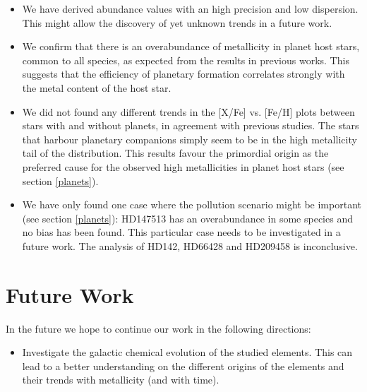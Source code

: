 \documentclass[dvips,12pt,a4paper]{report}
\begin{document}
{{\begin{itemize}
\item We have derived abundance values with an high precision and low dispersion. This might allow the discovery of yet unknown trends in a future work. 
\item We confirm that there is an overabundance of metallicity in planet host stars, common to all species, as expected from the results in previous works. This suggests that the efficiency of planetary formation correlates strongly with the metal content of the host star. 
\item We did not found any different trends in the [X/Fe] vs. [Fe/H] plots between stars with and without planets, in agreement with previous studies. The stars that harbour planetary companions simply seem to be in the high metallicity tail of the distribution. This results favour the primordial origin as the preferred cause for the observed high metallicities in planet host stars (see section \ref{planets}). %
\item We have only found one case where the pollution scenario might be important (see section \ref{planets}): HD147513 has an overabundance in some species and no bias has been found. This particular case needs to be investigated in a future work. The analysis of HD142, HD66428 and HD209458 is inconclusive. 

\end{itemize}

\section {Future Work}

In the future we hope to continue our work in the following directions:

\begin{itemize}
 
\item Investigate the galactic chemical evolution of the studied elements. This can lead to a better understanding on the different origins of the elements and their trends with metallicity (and with time). 


\end{itemize}}}
\end{document}
